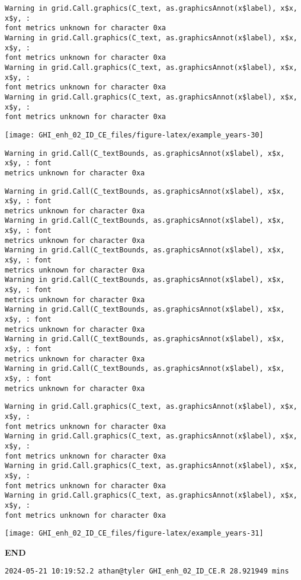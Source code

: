 \documentclass[
  10pt,
  a4paper,oneside]{article}
\begin{document}
\begin{verbatim}
Warning in grid.Call.graphics(C_text, as.graphicsAnnot(x$label), x$x, x$y, :
font metrics unknown for character 0xa
Warning in grid.Call.graphics(C_text, as.graphicsAnnot(x$label), x$x, x$y, :
font metrics unknown for character 0xa
Warning in grid.Call.graphics(C_text, as.graphicsAnnot(x$label), x$x, x$y, :
font metrics unknown for character 0xa
Warning in grid.Call.graphics(C_text, as.graphicsAnnot(x$label), x$x, x$y, :
font metrics unknown for character 0xa
\end{verbatim}

\begin{center}\texttt{[image: GHI\_enh\_02\_ID\_CE\_files/figure-latex/example\_years-30]} \end{center}

\begin{verbatim}
Warning in grid.Call(C_textBounds, as.graphicsAnnot(x$label), x$x, x$y, : font
metrics unknown for character 0xa
\end{verbatim}

\begin{verbatim}
Warning in grid.Call(C_textBounds, as.graphicsAnnot(x$label), x$x, x$y, : font
metrics unknown for character 0xa
Warning in grid.Call(C_textBounds, as.graphicsAnnot(x$label), x$x, x$y, : font
metrics unknown for character 0xa
Warning in grid.Call(C_textBounds, as.graphicsAnnot(x$label), x$x, x$y, : font
metrics unknown for character 0xa
Warning in grid.Call(C_textBounds, as.graphicsAnnot(x$label), x$x, x$y, : font
metrics unknown for character 0xa
Warning in grid.Call(C_textBounds, as.graphicsAnnot(x$label), x$x, x$y, : font
metrics unknown for character 0xa
Warning in grid.Call(C_textBounds, as.graphicsAnnot(x$label), x$x, x$y, : font
metrics unknown for character 0xa
Warning in grid.Call(C_textBounds, as.graphicsAnnot(x$label), x$x, x$y, : font
metrics unknown for character 0xa
\end{verbatim}

\begin{verbatim}
Warning in grid.Call.graphics(C_text, as.graphicsAnnot(x$label), x$x, x$y, :
font metrics unknown for character 0xa
Warning in grid.Call.graphics(C_text, as.graphicsAnnot(x$label), x$x, x$y, :
font metrics unknown for character 0xa
Warning in grid.Call.graphics(C_text, as.graphicsAnnot(x$label), x$x, x$y, :
font metrics unknown for character 0xa
Warning in grid.Call.graphics(C_text, as.graphicsAnnot(x$label), x$x, x$y, :
font metrics unknown for character 0xa
\end{verbatim}

\begin{center}\texttt{[image: GHI\_enh\_02\_ID\_CE\_files/figure-latex/example\_years-31]} \end{center}

\textbf{END}

\begin{verbatim}
2024-05-21 10:19:52.2 athan@tyler GHI_enh_02_ID_CE.R 28.921949 mins
\end{verbatim}
\end{document}
